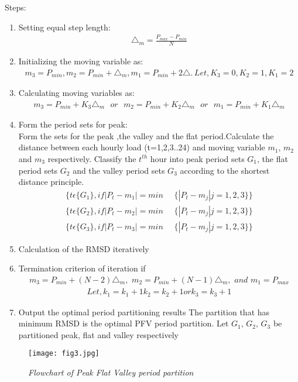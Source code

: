 \documentclass[14 pt]{article}
\begin{document}
\pagebreak
Steps:
\begin{enumerate}
\item Setting equal step length: \\
\begin{eqnarray*}
\triangle _{m}=\frac{P_{max}-P_{min}}{N}
\end{eqnarray*}
\item Initializing the moving variable as: \\
\begin{eqnarray*}
m_3=P_{min}, m_2=P_{min}+\triangle _{m},m_1=P_{min}+2\triangle.\,Let, K_3=0,K_2=1,K_1=2
\end{eqnarray*}
\item Calculating moving variables as:
\begin{eqnarray*}
m_3=P_{min}+K_3\triangle _{m}\,\,\,\,or\,\,\,\,m_2=P_{min}+K_2\triangle _{m}\,\,\,\,or\,\,\,\,m_1=P_{min}+K_1\triangle _{m} 
\end{eqnarray*}
\item Form the period sets for peak:\\
Form the sets for the peak ,the valley and the flat period.Calculate the distance between each hourly load (t=1,2,3..24) and moving variable $m_1$, $m_2$
and $m_3$ respectively. Classify the $t^
{th}$ hour into peak period sets $G_1$, the
flat period sets $G_2$ and the valley period sets $G_3$ according to the shortest
distance principle.\\
\begin{eqnarray*}
\lbrace t\epsilon \lbrace G_1 \rbrace ,if|P_t-m_1|=min\,\,\,\,\,\,\,\,\lbrace |P_t-m_j|j=1,2,3\rbrace \rbrace
\end{eqnarray*}
\begin{eqnarray*}
\lbrace t\epsilon \lbrace G_2 \rbrace ,if|P_t-m_2|=min\,\,\,\,\,\,\,\,\lbrace |P_t-m_j|j=1,2,3\rbrace \rbrace
\end{eqnarray*}
\begin{eqnarray*}
\lbrace t\epsilon \lbrace G_3 \rbrace ,if|P_t-m_3|=min\,\,\,\,\,\,\,\,\lbrace |P_t-m_j|j=1,2,3\rbrace \rbrace
\end{eqnarray*}
\item  Calculation of the RMSD iteratively
\item Termination criterion of iteration if
\begin{eqnarray*}
m_3 = P_{min} +(N-2)\triangle _m,\,\,m_2 = P_{min} +(N-1)\triangle _m,\,\,and\,\, m_1 = P_{max}\end{eqnarray*}
\begin{eqnarray*}
Let, k_1=k_1+1 k_2=k_2+1 or k_3=k_3+1
\end{eqnarray*}
\item Output the optimal period partitioning results The partition that has minimum RMSD is the optimal PFV period partition. Let $G_1$, $G_2$, $G_3$ be partitioned peak, flat and valley respectively
\end{enumerate}
\pagebreak
\begin{figure}[H]
\centering
\texttt{[image: fig3.jpg]}
\caption{\textit{Flowchart of Peak Flat Valley period partition
}}
\end{figure}
\pagebreak
\end{document}
